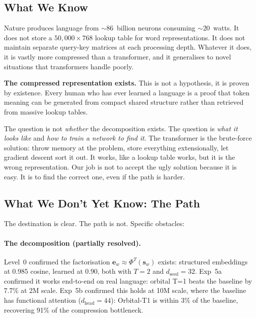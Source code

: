 \documentclass[11pt, a4paper]{article}
\newcommand{\s}{\mathbf{s}}
\theoremstyle{remark}
\begin{document}
\subsection{What We Know}

Nature produces language from $\sim$86~billion neurons consuming $\sim$20~watts.
It does not store a $50{,}000 \times 768$ lookup table for word representations.
It does not maintain separate query-key matrices at each processing depth.
Whatever it does, it is vastly more compressed than a transformer, and it generalises to novel situations that transformers handle poorly.

\textbf{The compressed representation exists.}
This is not a hypothesis, it is proven by existence.
Every human who has ever learned a language is a proof that token meaning can be generated from compact shared structure rather than retrieved from massive lookup tables.

The question is not \emph{whether} the decomposition exists.
The question is \emph{what it looks like} and \emph{how to train a network to find it}.
The transformer is the brute-force solution: throw memory at the problem, store everything extensionally, let gradient descent sort it out.
It works, like a lookup table works, but it is the wrong representation.
Our job is not to accept the ugly solution because it is easy.
It is to find the correct one, even if the path is harder.

\subsection{What We Don't Yet Know: The Path}

The destination is clear.
The path is not.
Specific obstacles:

\paragraph{The decomposition (partially resolved).}
Level~0 confirmed the factorisation $\mathbf{e}_w \approx \Phi^T(\s_w)$ exists: structured embeddings at 0.985 cosine, learned at 0.90, both with $T{=}2$ and $d_{\text{seed}}{=}32$.
Exp~5a confirmed it works end-to-end on real language: orbital T=1 beats the baseline by 7.7\% at 2M scale.
Exp~5b confirmed this holds at 10M scale, where the baseline has functional attention ($d_{\text{head}}{=}44$): Orbital-T1 is within 3\% of the baseline, recovering 91\% of the compression bottleneck.
\end{document}

